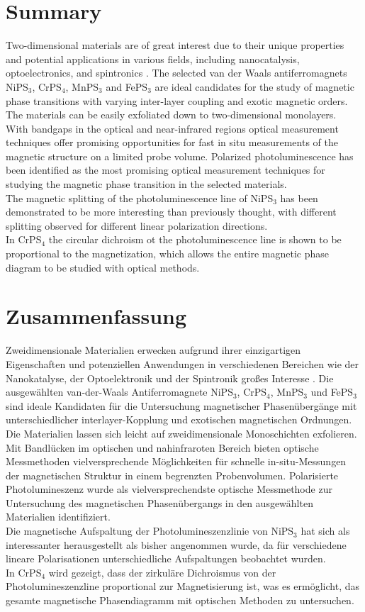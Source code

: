 \documentclass[
	oneside,
	parskip=half,
	a4paper,
]{scrbook}
\begin{document}
\section*{Summary}
Two-dimensional materials are of great interest due to their unique properties and potential applications in various fields, including nanocatalysis, optoelectronics, and spintronics \cite{MPX_review}. 
The selected van der Waals antiferromagnets NiPS$_3$, CrPS$_4$, MnPS$_3$ and FePS$_3$ are ideal candidates for the study of magnetic phase transitions with varying inter-layer coupling and exotic magnetic orders.
The materials can be easily exfoliated down to two-dimensional monolayers.\\
With bandgaps in the optical and near-infrared regions optical measurement techniques offer promising opportunities for fast in situ measurements of the magnetic structure on a limited probe volume.
Polarized photoluminescence has been identified as the most promising optical measurement techniques for studying the magnetic phase transition in the selected materials.\\
The magnetic splitting of the photoluminescence line of NiPS$_3$ has been demonstrated to be more interesting than previously thought, with different splitting observed for different linear polarization directions.\\
In CrPS$_4$ the circular dichroism ot the photoluminescence line is shown to be proportional to the magnetization, which allows the entire magnetic phase diagram to be studied with optical methods.

\vfill
\section*{Zusammenfassung}
Zweidimensionale Materialien erwecken aufgrund ihrer einzigartigen Eigenschaften und potenziellen Anwendungen in verschiedenen Bereichen wie der Nanokatalyse, der Optoelektronik und der Spintronik großes Interesse \cite{MPX_review}.
Die ausgewählten van-der-Waals Antiferromagnete NiPS$_3$, CrPS$_4$, MnPS$_3$ und FePS$_3$ sind ideale Kandidaten für die Untersuchung magnetischer Phasenübergänge mit unterschiedlicher interlayer-Kopplung und exotischen magnetischen Ordnungen.
Die Materialien lassen sich leicht auf zweidimensionale Monoschichten exfolieren.\\
Mit Bandlücken im optischen und nahinfraroten Bereich bieten optische Messmethoden vielversprechende Möglichkeiten für schnelle in-situ-Messungen der magnetischen Struktur in einem begrenzten Probenvolumen. 
Polarisierte Photolumineszenz wurde als vielversprechendste optische Messmethode zur Untersuchung des magnetischen Phasenübergangs in den ausgewählten Materialien identifiziert.\\
Die magnetische Aufspaltung der Photolumineszenzlinie von NiPS$_3$ hat sich als interessanter herausgestellt als bisher angenommen wurde, da für verschiedene lineare Polarisationen unterschiedliche Aufspaltungen beobachtet wurden.\\
In CrPS$_4$ wird gezeigt, dass der zirkuläre Dichroismus von der Photolumineszenzline proportional zur Magnetisierung ist, was es ermöglicht, das gesamte magnetische Phasendiagramm mit optischen Methoden zu untersuchen.
\end{document}
